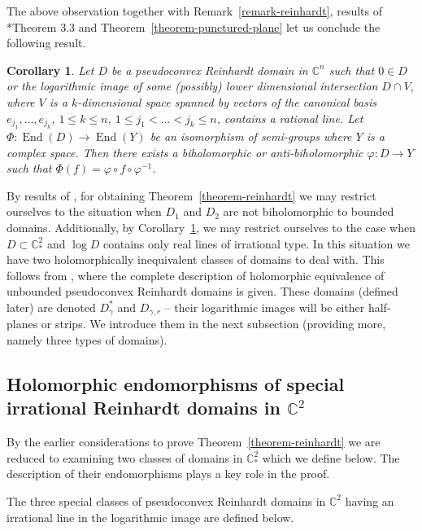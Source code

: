 \documentclass[a4paper,12pt]{amsart}
\DeclareMathOperator{\enmo}{End}
\newtheorem{corollary}[theorem]{Corollary}
\theoremstyle{definition}
\begin{document}
The above observation together with Remark~\ref{remark-reinhardt}, results of \cite{MR2763719}*{Theorem 3.3} and Theorem~\ref{theorem-punctured-plane} let us conclude the following result.

\begin{corollary}\label{corollary:higher-dimension} Let $D$ be a pseudoconvex Reinhardt domain in $\mathbb C^n$ such that $0\in D$ or the logarithmic image of some (possibly) lower dimensional intersection $D\cap V$, where $V$ is a $k$-dimensional space spanned by vectors of the canonical basis $e_{j_1},\ldots,e_{j_k}$, $1\leq k\leq n$, $1\leq j_1<\ldots<j_k\leq n$, contains a rational line. Let $\Phi\colon\enmo(D)\to\enmo(Y)$ be an isomorphism of semi-groups where $Y$ is a complex space. Then there exists a biholomorphic or anti-biholomorphic $\varphi \colon D\to Y$ such that $\Phi(f)=\varphi\circ f\circ \varphi^{-1}$.    
\end{corollary}

By results of \cite{01721089}, for obtaining Theorem~\ref{theorem-reinhardt} we may restrict ourselves to the situation when $D_1$ and $D_2$ are not biholomorphic to bounded domains. Additionally, by Corollary~\ref{corollary:higher-dimension}, we may restrict ourselves to the case when $D\subset\mathbb C_*^2$ and $\log D$ contains only real lines of irrational type. In this situation we have two holomorphically inequivalent classes of domains to deal with. This follows from \cite{05208635}, where the complete description of holomorphic equivalence of unbounded pseudoconvex Reinhardt domains is given. These domains (defined later) are denoted $D_{\gamma}^*$ and $D_{\gamma,r}$ -- their logarithmic images will be either half-planes or strips. We introduce them in the next subsection (providing more, namely three types of domains). 

\subsection{Holomorphic endomorphisms of special irrational Reinhardt domains in $\mathbb C^2$}
By the earlier considerations to prove Theorem~\ref{theorem-reinhardt} we are reduced to examining  two classes of domains in $\mathbb C_*^2$ which we define below. The description of their endomorphisms plays a key role in the proof. 

The three special classes of pseudoconvex Reinhardt domains in $\mathbb C^2$ having an irrational line in the logarithmic image are defined below.
\end{document}
